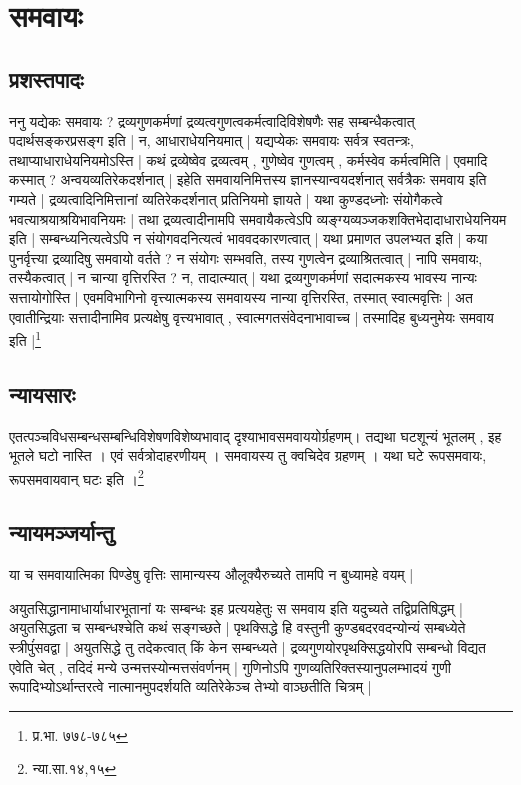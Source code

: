 \chapter{समवायः}

\section{प्रशस्तपादः} ननु यद्येकः समवायः ? द्रव्यगुणकर्मणां द्रव्यत्वगुणत्वकर्मत्वादिविशेषणैः सह सम्बन्धैकत्वात् पदार्थसङ्करप्रसङ्ग इति | न, आधाराधेयनियमात् | यद्यप्येकः समवायः सर्वत्र स्वतन्त्रः, तथाप्याधाराधेयनियमोऽस्ति | कथं द्रव्येष्वेव द्रव्यत्वम् , गुणेष्वेव गुणत्वम् , कर्मस्वेव कर्मत्वमिति | एवमादि कस्मात् ? अन्वयव्यतिरेकदर्शनात् | इहेति समवायनिमित्तस्य ज्ञानस्यान्वयदर्शनात् सर्वत्रैकः समवाय इति गम्यते | द्रव्यत्वादिनिमित्तानां व्यतिरेकदर्शनात् प्रतिनियमो ज्ञायते | यथा कुण्डदध्नोः संयोगैकत्वे भवत्याश्रयाश्रयिभावनियमः | तथा द्रव्यत्वादीनामपि समवायैकत्वेऽपि व्यङ्ग्यव्यञ्जकशक्तिभेदादाधाराधेयनियम इति | सम्बन्ध्यनित्यत्वेऽपि न संयोगवदनित्यत्वं भाववदकारणत्वात् | यथा प्रमाणत उपलभ्यत इति | कया पुनर्वृत्त्या द्रव्यादिषु समवायो वर्तते ? न संयोगः सम्भवति, तस्य गुणत्वेन द्रव्याश्रितत्वात् | नापि समवायः, तस्यैकत्वात् | न चान्या वृत्तिरस्ति ? न, तादात्म्यात् | यथा द्रव्यगुणकर्मणां सदात्मकस्य भावस्य नान्यः सत्तायोगोस्ति | एवमविभागिनो वृत्त्यात्मकस्य समवायस्य नान्या वृत्तिरस्ति, तस्मात् स्वात्मवृत्तिः | अत एवातीन्द्रियाः सत्तादीनामिव प्रत्यक्षेषु वृत्त्यभावात् , स्वात्मगतसंवेदनाभावाच्च | तस्मादिह बुध्यनुमेयः समवाय इति |\footnote{प्र.भा. ७७८-७८५}

\section{न्यायसारः} एतत्पञ्चविधसम्बन्धसम्बन्धिविशेषणविशेष्यभावाद् दृश्याभावसमवाययोर्ग्रहणम्। तद्यथा घटशून्यं भूतलम् , इह भूतले घटो नास्ति । एवं सर्वत्रोदाहरणीयम् । समवायस्य तु क्वचिदेव ग्रहणम् । यथा घटे रूपसमवायः, रूपसमवायवान् घटः इति ।\footnote{न्या.सा.१४,१५}



\section{न्यायमञ्जर्यान्तु} या च समवायात्मिका पिण्डेषु वृत्तिः सामान्यस्य औलूक्यैरुच्यते तामपि न बुध्यामहे वयम् |

अयुतसिद्धानामाधार्याधारभूतानां यः सम्बन्धः इह प्रत्ययहेतुः स समवाय इति यदुच्यते तद्विप्रतिषिद्धम् | अयुतसिद्धता च सम्बन्धश्चेति कथं सङ्गच्छते | पृथक्सिद्धे हि वस्तुनी कुण्डबदरवदन्योन्यं‌ सम्बध्येते स्त्रीपुंंसवद्वा | अयुतसिद्धे तु तदेकत्वात् किं केन सम्बन्ध्यते | द्रव्यगुणयोरपृथक्सिद्धयोरपि सम्बन्धो विद्यत एवेति चेत् , तदिदं मन्ये उन्मत्तस्योन्मत्तसंवर्णनम् | गुणिनोऽपि गुणव्यतिरिक्तस्यानुपलम्भादयं गुणी रूपादिभ्योऽर्थान्तरत्वे नात्मानमुपदर्शयति व्यतिरेकेञ्च तेभ्यो वाञ्छतीति चित्रम् |

